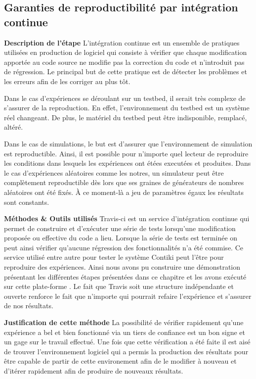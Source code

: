 \subsection{Garanties de reproductibilité par intégration continue} %
\label{sub:performance_evaluation}

\textbf{Description de l'étape} L'intégration continue est un ensemble de
pratiques utilisées en production de logiciel qui consiste à vérifier que
chaque modification apportée au code source ne modifie pas la correction du
code et n'introduit pas de régression. Le principal but de cette pratique est
de détecter les problèmes et les erreurs afin de les corriger au plus tôt.

Dans le cas d'expériences se déroulant sur un testbed, il serait très complexe
de s'assurer de la reproduction. En effet, l’environnement du testbed est un
système réel changeant. De plus, le matériel du testbed peut être
indisponible, remplacé, altéré.

Dans le cas de simulations, le but est d'assurer que l’environnement de
simulation est reproductible. Ainsi, il est possible pour n'importe quel
lecteur de reproduire les conditions dans lesquels les expériences ont étées
executées et produites. Dans le cas d'expériences aléatoires comme les notres,
un simulateur peut être complètement reproductible dès lors que ses graines de
générateurs de nombres aléatoires ont été fixés. À ce moment-là a jeu de
paramètres égaux les résultats sont constants.

\textbf{Méthodes \& Outils utilisés} Travis-ci \cite{travis} est un service
d'intégration continue qui permet de construire et d’exécuter une série de
tests lorsqu'une modification proposée ou effective du code a lieu. Lorsque la
série de tests est terminée on peut ainsi vérifier qu'aucune régression des
fonctionnalités n'a été commise. Ce service utilisé entre autre pour tester le
système Contiki \cite{contiki_travis} peut l'être pour reproduire des
expériences. Ainsi nous avons pu construire une démonstration présentant les
différentes étapes présentées dans ce chapitre et les avons exécuté sur cette
plate-forme \cite{leone2014demo}. Le fait que Travis soit une structure
indépendante et ouverte renforce le fait que n'importe qui pourrait refaire
l'expérience et s'assurer de nos résultats.

\textbf{Justification de cette méthode} La possibilité de vérifier rapidement
qu'une expérience a bel et bien fonctionné via un tiers de confiance est un
bon signe et un gage sur le travail effectué. Une fois que cette vérification
a été faite il est aisé de trouver l'environnement logiciel qui a permis la
production des résultats pour être capable de partir de cette environement
afin de le modifier à nouveau et d'itérer rapidement afin de produire de
nouveaux résultats.


